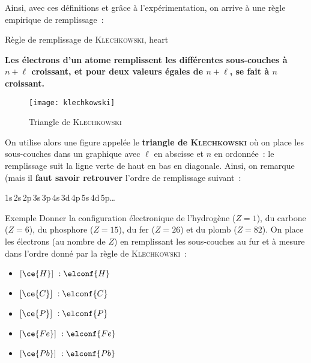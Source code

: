 \documentclass[../main/main.tex]{subfiles}
\begin{document}
Ainsi, avec ces définitions et grâce à l'expérimentation, on arrive à une règle
empirique de remplissage~:

\begin{tror}{Règle de remplissage de \textsc{Klechkowski}, heart}
    \begin{center}
        \bfseries
        Les électrons d'un atome remplissent les différentes sous-couches à
        $n+\ell$ croissant, et pour deux valeurs égales de $n+\ell$, se fait à
        $n$ croissant.
    \end{center}
    \begin{minipage}{0.45\linewidth}
        \begin{figure}[H]
            \centering
            \texttt{[image: klechkowski]}
            \caption{Triangle de \textsc{Klechkowski}}
            \label{fig:klech}
        \end{figure}
    \end{minipage}
    \hfill
    \begin{minipage}{0.45\linewidth}
        On utilise alors une figure appelée le \textbf{triangle de
        \textsc{Klechkowski}} où on place les sous-couches dans un graphique avec
        $\ell$ en abscisse et $n$ en ordonnée~: le remplissage suit la ligne verte
        de haut en bas en diagonale. \bigbreak
        Ainsi, on remarque (mais il \textbf{faut savoir retrouver} l'ordre de
        remplissage suivant~:
        \begin{center}
            1s\,2s\,2p\,3s\,3p\,4s\,3d\,4p\,5s\,4d\,5p…
        \end{center}
    \end{minipage}
\end{tror}

\begin{rexem}{Exemple}
    Donner la configuration électronique de l'hydrogène ($Z = 1$), du carbone
    ($Z = 6$), du phosphore ($Z = 15$), du fer ($Z=26$) et du plomb ($Z=82$).
    \tcblower
    On place les électrons (au nombre de $Z$) en remplissant les sous-couches au
    fur et à mesure dans l'ordre donné par la règle de \textsc{Klechkowski}~:
    \begin{itemize}[label=$\diamond$, leftmargin=20pt]
        \item $[\ce{H}]~: \elconf{H}$
        \item $[\ce{C}]~: \elconf{C}$
        \item $[\ce{P}]~: \elconf{P}$
        \item $[\ce{Fe}]~: \elconf{Fe}$
        \item $[\ce{Pb}]~: \elconf{Pb}$
    \end{itemize}
\end{rexem}
\end{document}
